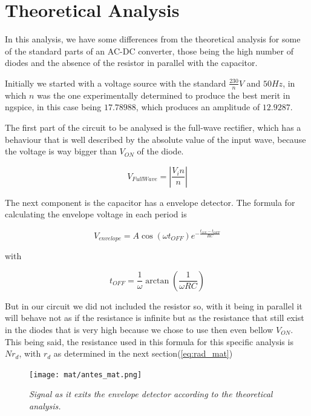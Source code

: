 \section{Theoretical Analysis}

In this analysis, we have some differences from the theoretical analysis for some of the standard parts of an AC-DC converter, those being the high number of diodes and the absence of the resistor in parallel with the capacitor.

Initially we started with a voltage source with the standard $\frac{230}{n}V$ and $50Hz$, in which $n$ was the one experimentally determined to produce the best merit in ngspice, in this case being $17.78988$, which produces an amplitude of $12.9287$.

The first part of the circuit to be analysed is the full-wave rectifier, which has a behaviour that is well described by the absolute value of the input wave, because the voltage is way bigger than $V_{ON}$ of the diode.

\begin{equation}
    V_{Full Wave} = \left|\frac{V_in}{n}\right|
    \label{eq:fullwave_mat}
\end{equation}

The next component is the capacitor has a envelope detector. The formula for calculating the envelope voltage in each period is 

\begin{equation}
    V_{envelope}=A\cos{(\omega t_{OFF})}e^{-\frac{t_{ON}-t_{OFF}}{RC}}
\end{equation}

with 

\begin{equation}
    t_{OFF}=\frac{1}{\omega}\arctan\left(\frac{1}{\omega R C}\right)
\end{equation}

But in our circuit we did not included the resistor so, with it being in parallel it will behave not as if the resistance is infinite but as the resistance that still exist in the diodes that is very high because we chose to use then even bellow $V_{ON}$. This being said, the resistance used in this formula for this specific analysis is $N r_d$, with $r_d$ as determined in the next section(\eqref{eq:rad_mat})

\begin{figure}[H]
    \centering
    \texttt{[image: mat/antes\_mat.png]}
        \caption{\textit{Signal as it exits the envelope detector according to the theoretical analysis.}}
    \label{fig:plot}
\end{figure}

